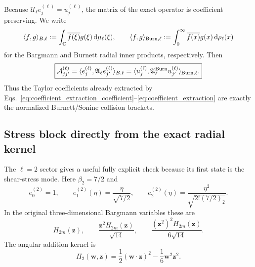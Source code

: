 \documentclass[11pt]{article}
\numberwithin{equation}{section}
\newcommand{\C}{\mathbb C}
\newcommand{\dd}{\,\mathrm d}
\theoremstyle{definition}
\begin{document}
Because $\mathcal U_\ell e_j^{(\ell)}=u_j^{(\ell)}$, the matrix of the exact
operator is coefficient preserving.  We write
\begin{equation}
 \langle f,g\rangle_{B,\ell}
 :=\int_{\C}\overline{f(\xi)}g(\xi)\dd\mu_\ell(\xi),
 \qquad
 \langle f,g\rangle_{{\rm Burn},\ell}
 :=\int_0^\infty\overline{f(x)}g(x)\dd\rho_\ell(x)
 \label{eq:radial_inner_products}
\end{equation}
for the Bargmann and Burnett radial inner products, respectively.  Then
\begin{equation}
 \boxed{
 \mathcal A^{(\ell)}_{jj'}
 =\langle e_j^{(\ell)},\mathfrak A_\ell e_{j'}^{(\ell)}\rangle_{B,\ell}
 =\langle u_j^{(\ell)},\mathfrak A_\ell^{\rm Burn}u_{j'}^{(\ell)}\rangle_{{\rm Burn},\ell}.
 }
 \label{eq:Burnett_same_matrix}
\end{equation}
Thus the Taylor coefficients already extracted by
Eqs.~\eqref{eq:coefficient_extraction_coefficient}--\eqref{eq:coefficient_extraction}
are exactly the normalized Burnett/Sonine collision brackets.

\subsection{Stress block directly from the exact radial kernel}

The $\ell=2$ sector gives a useful fully explicit check because its first
state is the shear-stress mode.  Here $\beta_2=7/2$ and
\begin{equation}
 e_0^{(2)}=1,
 \qquad
 e_1^{(2)}(\eta)=\frac{\eta}{\sqrt{7/2}},
 \qquad
 e_2^{(2)}(\eta)=\frac{\eta^2}{\sqrt{2!(7/2)_2}}.
 \label{eq:l2_radial_basis_low}
\end{equation}
In the original three-dimensional Bargmann variables these are
\begin{equation}
 H_{2m}(\bm z),
 \qquad
 \frac{\bm z^2H_{2m}(\bm z)}{\sqrt{14}},
 \qquad
 \frac{(\bm z^2)^2H_{2m}(\bm z)}{6\sqrt{14}}.
 \label{eq:l2_full_states_low}
\end{equation}
The angular addition kernel is
\begin{equation}
 \Pi_2(\bm w,\bm z)
 =\frac12(\bm w\cdot\bm z)^2
 -\frac16\bm w^2\bm z^2.
 \label{eq:P2_again}
\end{equation}
\end{document}
